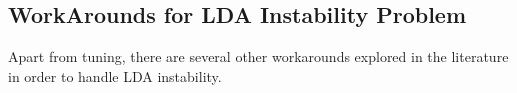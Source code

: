 \documentclass[10pt,conference]{IEEEtran}
\theoremstyle{break}
\begin{document}






\subsection{WorkArounds for LDA Instability Problem}
\label{sect: solutions}
Apart from tuning, there are several other workarounds explored in the literature
in order to handle LDA instability.
\end{document}
